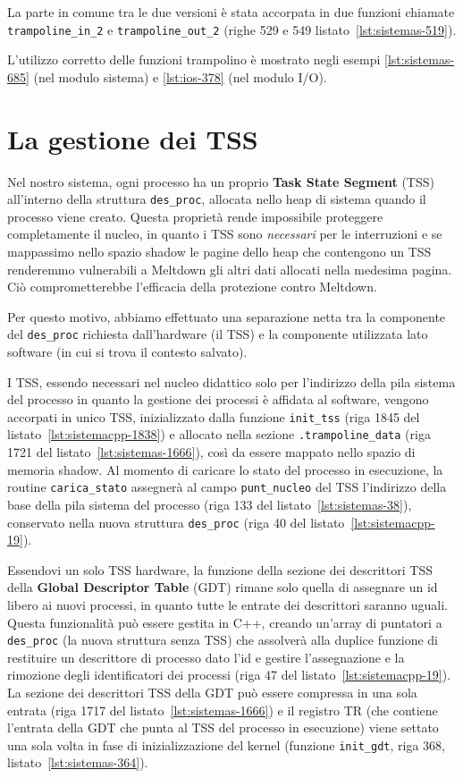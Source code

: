 La parte in comune tra le due versioni è stata accorpata in due funzioni chiamate \texttt{trampoline\_in\_2} e \texttt{trampoline\_out\_2} (righe 529 e 549 listato~\vref{lst:sistemas-519}).

L'utilizzo corretto delle funzioni trampolino è mostrato negli esempi \vref{lst:sistemas-685} (nel modulo sistema) e \vref{lst:ios-378} (nel modulo I/O).

\section{La gestione dei TSS}
Nel nostro sistema, ogni processo ha un proprio \textbf{Task State Segment} (TSS) all'interno della struttura \texttt{des\_proc}, allocata nello heap di sistema quando il processo viene creato.
Questa proprietà rende impossibile proteggere completamente il nucleo, in quanto i TSS sono \emph{necessari} per le interruzioni e se mappassimo nello spazio shadow le pagine dello heap che contengono un TSS renderemmo vulnerabili a Meltdown gli altri dati allocati nella medesima pagina.
Ciò comprometterebbe l'efficacia della protezione contro Meltdown.

Per questo motivo, abbiamo effettuato una separazione netta tra la componente del \texttt{des\_proc} richiesta dall'hardware (il TSS) e la componente utilizzata lato software (in cui si trova il contesto salvato).

I TSS, essendo necessari nel nucleo didattico solo per l'indirizzo della pila sistema del processo in quanto la gestione dei processi è affidata al software, vengono accorpati in unico TSS, inizializzato dalla funzione \texttt{init\_tss} (riga 1845 del listato~\vref{lst:sistemacpp-1838}) e allocato nella sezione \texttt{.trampoline\_data} (riga 1721 del listato~\vref{lst:sistemas-1666}), così da essere mappato nello spazio di memoria shadow.
Al momento di caricare lo stato del processo in esecuzione, la routine \texttt{carica\_stato} assegnerà al campo \texttt{punt\_nucleo} del TSS l'indirizzo della base della pila sistema del processo (riga 133 del listato~\vref{lst:sistemas-38}), conservato nella nuova struttura \texttt{des\_proc} (riga 40 del listato~\vref{lst:sistemacpp-19}).

Essendovi un solo TSS hardware, la funzione della sezione dei descrittori TSS della \textbf{Global Descriptor Table} (GDT) rimane solo quella di assegnare un id libero ai nuovi processi, in quanto tutte le entrate dei descrittori saranno uguali.
Questa funzionalità può essere gestita in C++, creando un'array di puntatori a \texttt{des\_proc} (la nuova struttura senza TSS) che assolverà alla duplice funzione di restituire un descrittore di processo dato l'id e gestire l'assegnazione e la rimozione degli identificatori dei processi (riga 47 del listato~\ref{lst:sistemacpp-19}).
La sezione dei descrittori TSS della GDT può essere compressa in una sola entrata (riga 1717 del listato~\vref{lst:sistemas-1666}) e il registro TR (che contiene l'entrata della GDT che punta al TSS del processo in esecuzione) viene settato una sola volta in fase di inizializzazione del kernel (funzione \texttt{init\_gdt}, riga 368, listato~\vref{lst:sistemas-364}).

